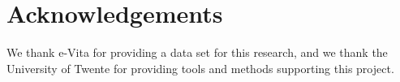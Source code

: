 \section{Acknowledgements}
We thank e-Vita for providing a data set for this research, and we thank the University of Twente for providing tools and methods supporting this project.